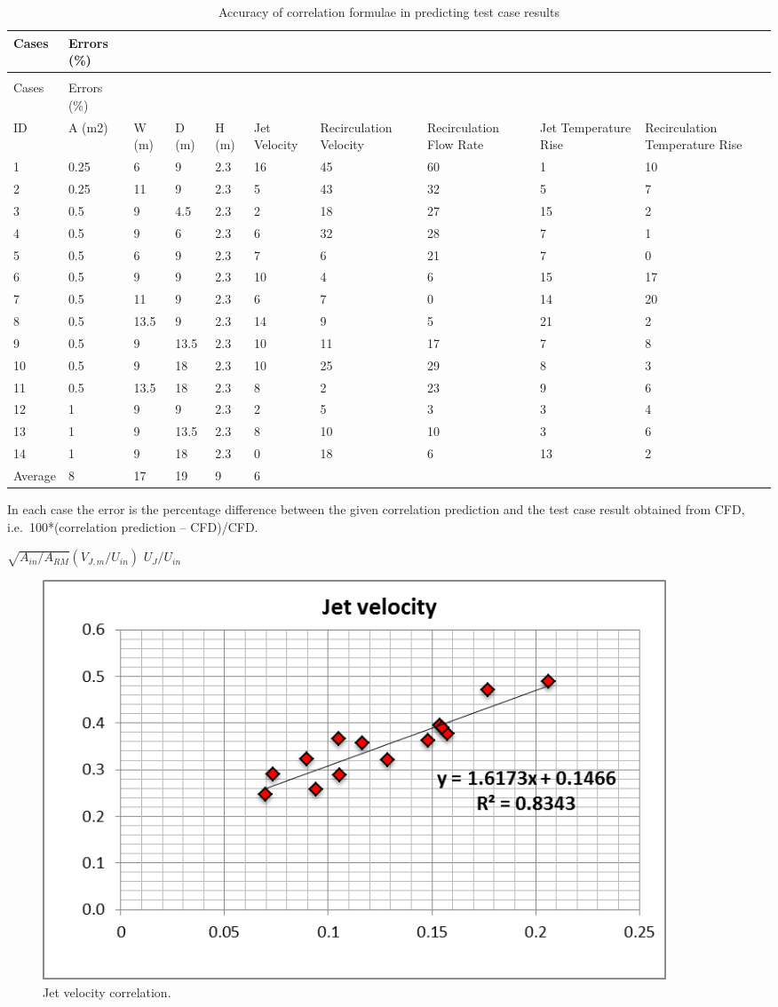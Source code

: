 \begin{longtable}[c]{p{0.5in}p{0.4in}p{0.4in}p{0.4in}p{0.4in}p{0.4in}p{0.6in}p{0.6in}p{0.6in}p{0.6in}}
\caption{Accuracy of correlation formulae in predicting test case results \label{table:accuracy-of-correlation-formulae-in}} \tabularnewline
\toprule 
Cases & Errors (\%) \tabularnewline
\midrule
\endfirsthead

\caption[]{Accuracy of correlation formulae in predicting test case results} \tabularnewline
\toprule 
Cases & Errors (\%) \tabularnewline
\midrule
\endhead

ID & A (m2) & W (m) & D (m) & H (m) & Jet Velocity & Recirculation Velocity & Recirculation Flow Rate & Jet Temperature Rise & Recirculation Temperature Rise \tabularnewline
1 & 0.25 & 6 & 9 & 2.3 & 16 & 45 & 60 & 1 & 10 \tabularnewline
2 & 0.25 & 11 & 9 & 2.3 & 5 & 43 & 32 & 5 & 7 \tabularnewline
3 & 0.5 & 9 & 4.5 & 2.3 & 2 & 18 & 27 & 15 & 2 \tabularnewline
4 & 0.5 & 9 & 6 & 2.3 & 6 & 32 & 28 & 7 & 1 \tabularnewline
5 & 0.5 & 6 & 9 & 2.3 & 7 & 6 & 21 & 7 & 0 \tabularnewline
6 & 0.5 & 9 & 9 & 2.3 & 10 & 4 & 6 & 15 & 17 \tabularnewline
7 & 0.5 & 11 & 9 & 2.3 & 6 & 7 & 0 & 14 & 20 \tabularnewline
8 & 0.5 & 13.5 & 9 & 2.3 & 14 & 9 & 5 & 21 & 2 \tabularnewline
9 & 0.5 & 9 & 13.5 & 2.3 & 10 & 11 & 17 & 7 & 8 \tabularnewline
10 & 0.5 & 9 & 18 & 2.3 & 10 & 25 & 29 & 8 & 3 \tabularnewline
11 & 0.5 & 13.5 & 18 & 2.3 & 8 & 2 & 23 & 9 & 6 \tabularnewline
12 & 1 & 9 & 9 & 2.3 & 2 & 5 & 3 & 3 & 4 \tabularnewline
13 & 1 & 9 & 13.5 & 2.3 & 8 & 10 & 10 & 3 & 6 \tabularnewline
14 & 1 & 9 & 18 & 2.3 & 0 & 18 & 6 & 13 & 2 \tabularnewline
Average & 8 & 17 & 19 & 9 & 6 \tabularnewline
\bottomrule
\end{longtable}

In each case the error is the percentage difference between the given correlation prediction and the test case result obtained from CFD, i.e.~100*\textbar{}(correlation prediction -- CFD)/CFD\textbar{}.

\(\sqrt {{A_{in}}/{A_{RM}}} \left( {{V_{J,m}}/{U_{in}}} \right)\) \({U_J}/{U_{in}}\) 

\begin{figure}[hbtp]
\centering
\includegraphics[width=0.9\textwidth, height=0.9\textheight, keepaspectratio=true]{media/image2652.png}
\caption{Jet velocity correlation. \protect \label{fig:jet-veolicty-correlation}}
\end{figure}


